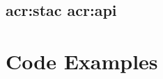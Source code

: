 \begin{appendix}
    \section[STAC API]{\acrshort{acr:stac} \acrshort{acr:api}}

    \chapter{Code Examples}

\end{appendix}
